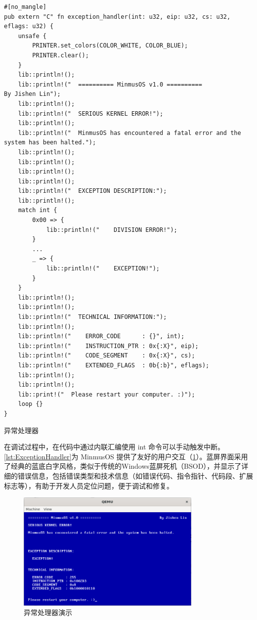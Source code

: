 \begin{listing}[htbp]
    \begin{verbatim}
#[no_mangle]
pub extern "C" fn exception_handler(int: u32, eip: u32, cs: u32, eflags: u32) {
    unsafe {
        PRINTER.set_colors(COLOR_WHITE, COLOR_BLUE);
        PRINTER.clear();
    }
    lib::println!();
    lib::println!("  ========== MinmusOS v1.0 ==========                            By Jishen Lin");
    lib::println!();
    lib::println!("  SERIOUS KERNEL ERROR!");
    lib::println!();
    lib::println!("  MinmusOS has encountered a fatal error and the system has been halted.");
    lib::println!();
    lib::println!();
    lib::println!();
    lib::println!();
    lib::println!("  EXCEPTION DESCRIPTION:");
    lib::println!();
    match int {
        0x00 => {
            lib::println!("    DIVISION ERROR!");
        }
        ...
        _ => {
            lib::println!("    EXCEPTION!");
        }
    }
    lib::println!();
    lib::println!();
    lib::println!("  TECHNICAL INFORMATION:");
    lib::println!();
    lib::println!("    ERROR_CODE      : {}", int);
    lib::println!("    INSTRUCTION_PTR : 0x{:X}", eip);
    lib::println!("    CODE_SEGMENT    : 0x{:X}", cs);
    lib::println!("    EXTENDED_FLAGS  : 0b{:b}", eflags);
    lib::println!();
    lib::println!();
    lib::print!("  Please restart your computer. :)");
    loop {}
}
    \end{verbatim}
    \caption{异常处理器}\label{lst:ExceptionHandler}
\end{listing}

在调试过程中，在代码中通过内联汇编使用 int 命令可以手动触发中断。\cref{lst:ExceptionHandler}为 MinmusOS 提供了友好的用户交互（\cref{fig:ExceptionHandlerPresentation}）。蓝屏界面采用了经典的蓝底白字风格，类似于传统的Windows蓝屏死机（BSOD），并显示了详细的错误信息，包括错误类型和技术信息（如错误代码、指令指针、代码段、扩展标志等），有助于开发人员定位问题，便于调试和修复。

\begin{figure}[htbp]
    \centering
    \includegraphics[width=0.8\textwidth]{figures/ExceptionHandlerPresentation.png}
    \caption{异常处理器演示}
    \label{fig:ExceptionHandlerPresentation}
\end{figure}

